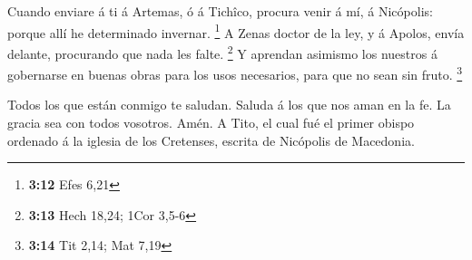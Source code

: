  Cuando enviare á ti á Artemas, ó á Tichîco, procura venir
á mí, á Nicópolis: porque allí he determinado invernar. \footnote{\textbf{3:12}
  Efes 6,21}  A Zenas doctor de la ley, y á Apolos, envía
delante, procurando que nada les falte. \footnote{\textbf{3:13} Hech
  18,24; 1Cor 3,5-6}  Y aprendan asimismo los nuestros á
gobernarse en buenas obras para los usos necesarios, para que no sean
sin fruto. \footnote{\textbf{3:14} Tit 2,14; Mat 7,19}

 Todos los que están conmigo te saludan. Saluda á los que
nos aman en la fe. La gracia sea con todos vosotros. Amén. A Tito, el
cual fué el primer obispo ordenado á la iglesia de los Cretenses,
escrita de Nicópolis de Macedonia.
